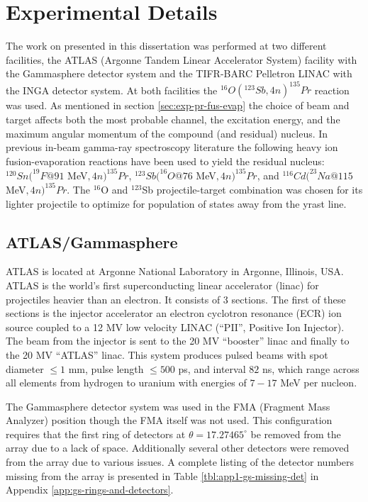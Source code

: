 \section{Experimental Details}
\label{sec:exp-pr-details}
The work on \pr{} presented in this dissertation was performed at two different facilities, the ATLAS (Argonne Tandem Linear Accelerator System) facility with the Gammasphere detector system and the TIFR-BARC Pelletron LINAC with the INGA detector system. At both facilities the $^{16}O(^{123}Sb,4n)^{135}Pr$ reaction was used. As mentioned in section \ref{sec:exp-pr-fus-evap} the choice of beam and target affects both the most probable channel, the excitation energy, and the maximum angular momentum of the compound (and residual) nucleus. In previous in-beam gamma-ray spectroscopy literature the following heavy ion fusion-evaporation reactions have been used to yield the \pr{} residual nucleus: $^{120}Sn(^{19}F @ 91$ MeV$, 4n)^{135}Pr$\cite{semkow135Pr}, $^{123}Sb(^{16}O @ 76$ MeV$,4n)^{135}Pr$\cite{135PrLifetimes}, and  $^{116}Cd(^{23}Na @ 115$ MeV$,4n)^{135}Pr$\cite{ePaul135Pr}. The $^{16}$O and $^{123}$Sb projectile-target combination was chosen for its lighter projectile to optimize for population of states away from the yrast line.

\subsection{ATLAS/Gammasphere}
\label{ssec:exp-pr-details-gs}
ATLAS is located at Argonne National Laboratory in Argonne, Illinois, USA. ATLAS is the world's first superconducting linear accelerator (linac) for projectiles heavier than an electron. It consists of 3 sections. The first of these sections is the injector accelerator an electron cyclotron resonance (ECR) ion source coupled to a 12 MV low velocity LINAC (``PII'', Positive Ion Injector). The beam from the injector is sent to the 20 MV ``booster'' linac and finally to the 20 MV ``ATLAS'' linac. This system produces pulsed beams with spot diameter $\leq1$ mm, pulse length $\leq500$ ps, and interval $82$ ns, which range across all elements from hydrogen to uranium with energies of $7-17$ MeV per nucleon.

The Gammasphere detector system was used in the FMA (Fragment Mass Analyzer) position though the FMA itself was not used. This configuration requires that the first ring of detectors at $\theta{}=17.27465^{\circ}$ be removed from the array due to a lack of space. Additionally several other detectors were removed from the array due to various issues. A complete listing of the detector numbers missing from the array is presented in Table \ref{tbl:app1-gs-missing-det} in Appendix \ref{app:gs-rings-and-detectors}.

